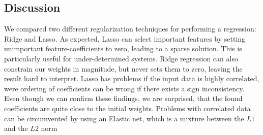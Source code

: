 \documentclass[a4paper, 11pt]{article}
\begin{document}
\subsection*{Discussion}
We compared two different regularization techniques for performing a regression: Ridge and Lasso. As expected, Lasso can select important features by setting unimportant feature-coefficients to zero, leading to a sparse solution. This is particularly useful for under-determined systems. Ridge regression can also constrain our weights in magnitude, but never sets them to zero, leaving the result hard to interpret. Lasso has problems if the input data is highly correlated, were ordering of coefficients can be wrong if there exists a sign inconsistency. Even though we can confirm these findings, we are surprised, that the found coefficients are quite close to the initial weights. Problems with correlated data can be circumvented by using an Elastic net, which is a mixture between the $L1$ and the $L2$ norm
\end{document}
